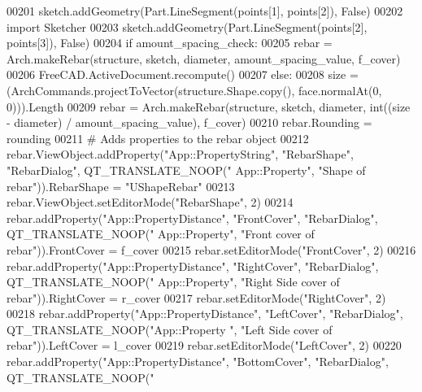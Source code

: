 \begin{DoxyCode}
00201     sketch.addGeometry(Part.LineSegment(points[1], points[2]), \textcolor{keyword}{False})
00202     \textcolor{keyword}{import} Sketcher
00203     sketch.addGeometry(Part.LineSegment(points[2], points[3]), \textcolor{keyword}{False})
00204     \textcolor{keywordflow}{if} amount\_spacing\_check:
00205         rebar = Arch.makeRebar(structure, sketch, diameter, amount\_spacing\_value, f\_cover)
00206         FreeCAD.ActiveDocument.recompute()
00207     \textcolor{keywordflow}{else}:
00208         size = (ArchCommands.projectToVector(structure.Shape.copy(), face.normalAt(0, 0))).Length
00209         rebar = Arch.makeRebar(structure, sketch, diameter, int((size - diameter) / amount\_spacing\_value), 
      f\_cover)
00210     rebar.Rounding = rounding
00211     \textcolor{comment}{# Adds properties to the rebar object}
00212     rebar.ViewObject.addProperty(\textcolor{stringliteral}{"App::PropertyString"}, \textcolor{stringliteral}{"RebarShape"}, \textcolor{stringliteral}{"RebarDialog"}, QT\_TRANSLATE\_NOOP(\textcolor{stringliteral}{"
      App::Property"}, \textcolor{stringliteral}{"Shape of rebar"})).RebarShape = \textcolor{stringliteral}{"UShapeRebar"}
00213     rebar.ViewObject.setEditorMode(\textcolor{stringliteral}{"RebarShape"}, 2)
00214     rebar.addProperty(\textcolor{stringliteral}{"App::PropertyDistance"}, \textcolor{stringliteral}{"FrontCover"}, \textcolor{stringliteral}{"RebarDialog"}, QT\_TRANSLATE\_NOOP(\textcolor{stringliteral}{"
      App::Property"}, \textcolor{stringliteral}{"Front cover of rebar"})).FrontCover = f\_cover
00215     rebar.setEditorMode(\textcolor{stringliteral}{"FrontCover"}, 2)
00216     rebar.addProperty(\textcolor{stringliteral}{"App::PropertyDistance"}, \textcolor{stringliteral}{"RightCover"}, \textcolor{stringliteral}{"RebarDialog"}, QT\_TRANSLATE\_NOOP(\textcolor{stringliteral}{"
      App::Property"}, \textcolor{stringliteral}{"Right Side cover of rebar"})).RightCover = r\_cover
00217     rebar.setEditorMode(\textcolor{stringliteral}{"RightCover"}, 2)
00218     rebar.addProperty(\textcolor{stringliteral}{"App::PropertyDistance"}, \textcolor{stringliteral}{"LeftCover"}, \textcolor{stringliteral}{"RebarDialog"}, QT\_TRANSLATE\_NOOP(\textcolor{stringliteral}{"App::Property
      "}, \textcolor{stringliteral}{"Left Side cover of rebar"})).LeftCover = l\_cover
00219     rebar.setEditorMode(\textcolor{stringliteral}{"LeftCover"}, 2)
00220     rebar.addProperty(\textcolor{stringliteral}{"App::PropertyDistance"}, \textcolor{stringliteral}{"BottomCover"}, \textcolor{stringliteral}{"RebarDialog"}, QT\_TRANSLATE\_NOOP(\textcolor{stringliteral}{"
}
\end{DoxyCode}
